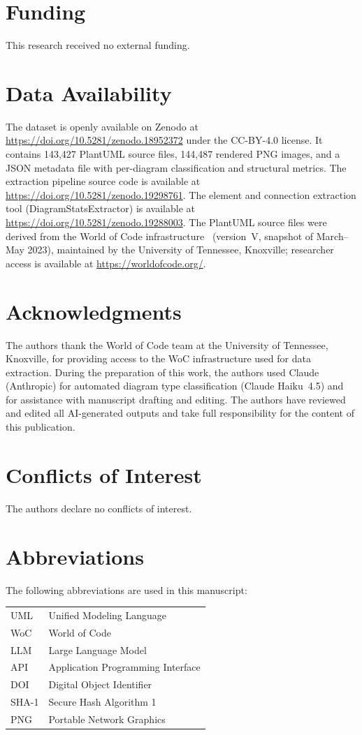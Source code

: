 \documentclass[11pt]{article}
\begin{document}
\section*{Funding}
This research received no external funding.

\section*{Data Availability}
The dataset is openly available on Zenodo at \url{https://doi.org/10.5281/zenodo.18952372} under the CC-BY-4.0 license. It contains 143,427 PlantUML source files, 144,487 rendered PNG images, and a JSON metadata file with per-diagram classification and structural metrics. The extraction pipeline source code is available at \url{https://doi.org/10.5281/zenodo.19298761}. The element and connection extraction tool (DiagramStatsExtractor) is available at \url{https://doi.org/10.5281/zenodo.19288003}. The PlantUML source files were derived from the World of Code infrastructure~\cite{ma2021world} (version~V, snapshot of March--May 2023), maintained by the University of Tennessee, Knoxville; researcher access is available at \url{https://worldofcode.org/}.

\section*{Acknowledgments}
The authors thank the World of Code team at the University of Tennessee, Knoxville, for providing access to the WoC infrastructure used for data extraction. During the preparation of this work, the authors used Claude (Anthropic) for automated diagram type classification (Claude Haiku~4.5) and for assistance with manuscript drafting and editing. The authors have reviewed and edited all AI-generated outputs and take full responsibility for the content of this publication.

\section*{Conflicts of Interest}
The authors declare no conflicts of interest.

\section*{Abbreviations}
The following abbreviations are used in this manuscript:

\noindent
\begin{tabular}{@{}ll}
UML   & Unified Modeling Language \\
WoC   & World of Code \\
LLM   & Large Language Model \\
API   & Application Programming Interface \\
DOI   & Digital Object Identifier \\
SHA-1 & Secure Hash Algorithm 1 \\
PNG   & Portable Network Graphics \\
\end{tabular}
\end{document}
